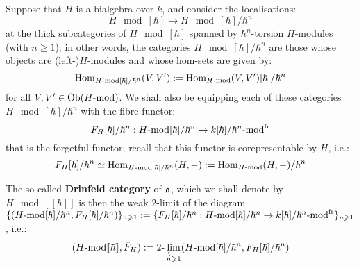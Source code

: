         \begin{definition} \label{def: drinfeld_categories_of_finite_type_bialgebras}
            Suppose that $H$ is a bialgebra over $k$, and consider the localisations:
                $$H\mod[\hbar] \to H\mod[\hbar]/\hbar^n$$
            at the thick subcategories of $H\mod[\hbar]$ spanned by $\hbar^n$-torsion $H$-modules (with $n \geq 1$); in other words, the categories $H\mod[\hbar]/\hbar^n$ are those whose objects are (left-)$H$-modules and whose hom-sets are given by:
                $$\Hom_{H\mod[\hbar]/\hbar^n}(V, V') := \Hom_{H\mod}(V, V')[\hbar]/\hbar^n$$
            for all $V, V' \in \Ob(H\mod)$. We shall also be equipping each of these categories $H\mod[\hbar]/\hbar^n$ with the fibre functor:
                $$F_H[\hbar]/\hbar^n: H\mod[\hbar]/\hbar^n \to k[\hbar]/\hbar^n\mod^{\fr}$$
            that is the forgetful functor; recall that this functor is corepresentable by $H$, i.e.:
                $$F_H[\hbar]/\hbar^n \cong \Hom_{H\mod[\hbar]/\hbar^n}(H, -) := \Hom_{H\mod}(H, -)/\hbar^n$$
                
            The so-called \textbf{Drinfeld category} of $\a$, which we shall denote by $H\mod[\![\hbar]\!]$ is then the weak $2$-limit of the diagram $\{ ( H\mod[\hbar]/\hbar^n, F_H[\hbar]/\hbar^n ) \}_{n \geq 1} := \{ F_H[\hbar]/\hbar^n: H\mod[\hbar]/\hbar^n \to k[\hbar]/\hbar^n\mod^{\fr} \}_{n \geq 1}$, i.e.:
                $$( H\mod[\![\hbar]\!], \hat{F}_H ) := 2\-\projlim_{n \geq 1} ( H\mod[\hbar]/\hbar^n, F_H[\hbar]/\hbar^n )$$
        \end{definition}
